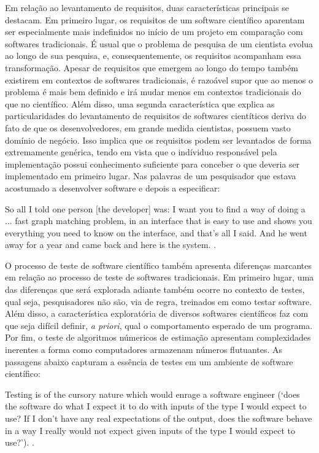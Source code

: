 \documentclass[
	article,			%
	11pt,				%
	oneside,			%
	a4paper,			%
	english,			%
	brazil,				%
	sumario=tradicional
	]{abntex2}
\begin{document}
Em relação ao levantamento de requisitos, duas características principais se destacam. Em primeiro lugar, os requisitos de um software científico aparentam ser especialmente mais indefinidos no início de um projeto em comparação com softwares tradicionais. É usual que o problema de pesquisa de um cientista evolua ao longo de sua pesquisa, e, consequentemente, os requisitos acompanham essa transformação. Apesar de requisitos que emergem ao longo do tempo também existirem em contextos de softwares tradicionais, é razoável supor que ao menos o problema é mais bem definido e irá mudar menos em contextos tradicionais do que no científico. Além disso, uma segunda característica que explica as particularidades do levantamento de requisitos de softwares cientíticos deriva do fato de que os desenvolvedores, em grande medida cientistas, possuem vasto domínio de negócio. Isso implica que os requisitos podem ser levantados de forma extremamente genérica, tendo em vista que o indíviduo responsável pela implementação possui conhecimento suficiente para conceber o que deveria ser implementado em primeiro lugar. Nas palavras de um pesquisador que estava acostumado a desenvolver software e depois a especificar:

\begin{citacao}
So all I told one person [the developer] was: I want you to find a way of doing a ... fast graph matching problem, in an interface that is easy to use and shows you everything you need to know on the interface, and that’s all I said. And he went away for a year and came back and here is the system. \cite{segal2008b}.
\end{citacao}

O processo de teste de software científico também apresenta diferenças marcantes em relação ao processo de teste de softwares tradicionais. Em primeiro lugar, uma das diferenças que será explorada adiante também ocorre no contexto de testes, qual seja, pesquisadores não são, via de regra, treinados em como testar software. Além disso, a característica exploratória de diversos softwares científicos faz com que seja difícil definir, \emph{a priori}, qual o comportamento esperado de um programa. Por fim, o teste de algoritmos númericos de estimação apresentam complexidades inerentes a forma como computadores armazenam números flutuantes. As passagens abaixo capturam a essência de testes em um ambiente de software científico:

\begin{citacao}
Testing is of the cursory nature which would enrage a software engineer (‘does the software do what I expect it to do with inputs of the type I would expect to use? If I don’t have any real expectations of the output, does the software behave in a way I really would not expect given inputs of the type I would expect to use?’). \cite{segal2008b}.
\end{citacao}
\end{document}
